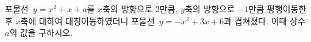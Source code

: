 포물선~$y=x^2+x+a$를 $x$축의 방향으로 $2$만큼, $y$축의 방향으로 $-1$만큼 평행이동한 후 $x$축에 대하여 대칭이동하였더니 포물선~$y=-x^2+3x+6$과 겹쳐졌다. 이때 상수 $a$의 값을 구하시오.
